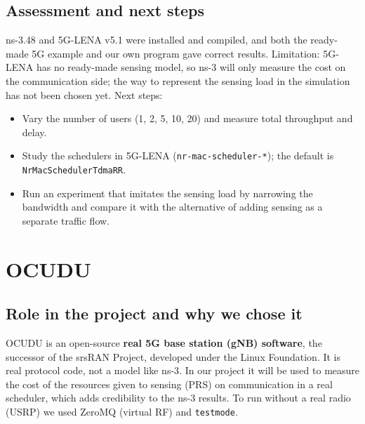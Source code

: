 \documentclass[10.5pt,a4paper]{article}
\begin{document}
\subsection{Assessment and next steps}
ns-3.48 and 5G-LENA v5.1 were installed and compiled, and both the ready-made 5G example and our own program gave correct results. Limitation: 5G-LENA has no ready-made sensing model, so ns-3 will only measure the cost on the communication side; the way to represent the sensing load in the simulation has not been chosen yet. Next steps:
\begin{itemize}
\item Vary the number of users (1, 2, 5, 10, 20) and measure total throughput and delay.
\item Study the schedulers in 5G-LENA (\texttt{nr-mac-scheduler-*}); the default is \texttt{NrMacSchedulerTdmaRR}.
\item Run an experiment that imitates the sensing load by narrowing the bandwidth and compare it with the alternative of adding sensing as a separate traffic flow.
\end{itemize}

\section{OCUDU}
\subsection{Role in the project and why we chose it}
OCUDU is an open-source \textbf{real 5G base station (gNB) software}, the successor of the srsRAN Project, developed under the Linux Foundation. It is real protocol code, not a model like ns-3. In our project it will be used to measure the cost of the resources given to sensing (PRS) on communication in a real scheduler, which adds credibility to the ns-3 results. To run without a real radio (USRP) we used ZeroMQ (virtual RF) and \texttt{testmode}.
\end{document}
